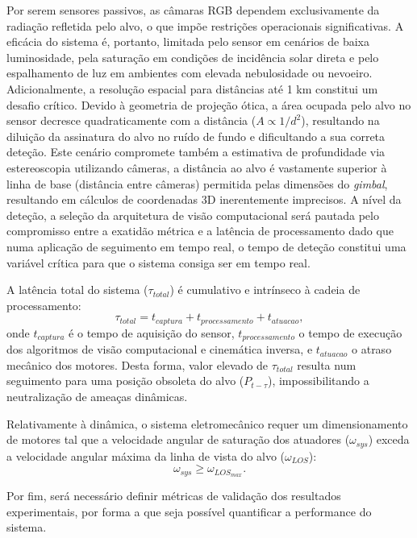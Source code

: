 \begin{introduction}
Por serem sensores passivos, as câmaras RGB dependem exclusivamente da radiação refletida pelo alvo, o que impõe restrições operacionais significativas. A eficácia do sistema é, portanto, limitada pelo sensor em cenários de baixa luminosidade, pela saturação em condições de incidência solar direta e pelo espalhamento de luz em ambientes com elevada nebulosidade ou nevoeiro. Adicionalmente, a resolução espacial para distâncias até 1 km constitui um desafio crítico. Devido à geometria de projeção ótica, a área ocupada pelo alvo no sensor decresce quadraticamente com a distância ($A \propto 1/d^2$), resultando na diluição da assinatura do alvo no ruído de fundo e dificultando a sua correta deteção. Este cenário compromete também a estimativa de profundidade via estereoscopia utilizando câmeras, a distância ao alvo é vastamente superior à linha de base (distância entre câmeras) permitida pelas dimensões do \emph{gimbal}, resultando em cálculos de coordenadas 3D inerentemente imprecisos. A nível da deteção, a seleção da arquitetura de visão computacional será pautada pelo compromisso entre a exatidão métrica e a latência de processamento dado que numa aplicação de seguimento em tempo real, o tempo de deteção constitui uma variável crítica para que o sistema consiga ser em tempo real.

A latência total do sistema ($\tau_{total}$) é cumulativo e intrínseco à cadeia de processamento:
\begin{equation}
    \tau_{total} = t_{captura} + t_{processamento} + t_{atuacao},
\end{equation}
onde $t_{captura}$ é o tempo de aquisição do sensor, $t_{processamento}$ o tempo de execução dos algoritmos de visão computacional e cinemática inversa, e $t_{atuacao}$ o atraso mecânico dos motores. Desta forma, valor elevado de $\tau_{total}$ resulta num seguimento para uma posição obsoleta do alvo ($P_{t-\tau}$), impossibilitando a neutralização de ameaças dinâmicas.

Relativamente à dinâmica, o sistema eletromecânico requer um dimensionamento de motores tal que a velocidade angular de saturação dos atuadores ($\omega_{sys}$) exceda a velocidade angular máxima da linha de vista do alvo ($\omega_{LOS}$):
\begin{equation}
    \omega_{sys} \ge \omega_{LOS_{max}}.
\end{equation}

Por fim, será necessário definir métricas de validação dos resultados experimentais, por forma a que seja possível quantificar a performance do sistema.


\end{introduction}
